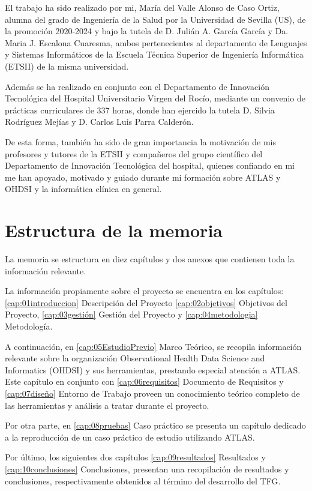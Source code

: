 El trabajo ha sido realizado por mi, María del Valle Alonso de Caso Ortiz, alumna del grado de Ingeniería de la Salud por la Universidad de Sevilla (US), de la promoción 2020-2024 y bajo la tutela de D. Julián A. García García y Da. Maria J. Escalona Cuaresma, ambos pertenecientes al departamento de Lenguajes y Sistemas Informáticos de la Escuela Técnica Superior de Ingeniería Informática (ETSII) de la misma universidad. 

Además se ha realizado en conjunto con el Departamento de Innovación Tecnológica del Hospital Universitario Virgen del Rocío, mediante un convenio de prácticas curriculares de 337 horas, donde han ejercido la tutela D. Silvia Rodríguez Mejías y D. Carlos Luis Parra Calderón. 

De esta forma, también ha sido de gran importancia la motivación de mis profesores y tutores de la ETSII y compañeros del grupo científico del Departamento de Innovación Tecnológica del hospital, quienes confiando en mi me han apoyado, motivado y guiado durante mi formación sobre ATLAS y OHDSI y la informática clínica en general.

\section{Estructura de la memoria} \label{sec:01estructura}

La memoria se estructura en diez capítulos y dos anexos que contienen toda la información relevante.

La información propiamente sobre el proyecto se encuentra en los capítulos: \ref{cap:01introduccion} Descripción del Proyecto \ref{cap:02objetivos} Objetivos del Proyecto, \ref{cap:03gestión} Gestión del Proyecto y \ref{cap:04metodologia} Metodología.

A continuación, en \ref{cap:05EstudioPrevio} Marco Teórico, se recopila información relevante sobre la organización Observational Health Data Science and Informatics (OHDSI) y sus herramientas, prestando especial atención a ATLAS. Este capítulo en conjunto con \ref{cap:06requisitos} Documento de Requisitos y \ref{cap:07diseño} Entorno de Trabajo proveen un conocimiento teórico completo de las herramientas y análisis a tratar durante el proyecto. 

Por otra parte, en \ref{cap:08pruebas} Caso práctico se presenta un capítulo dedicado a la reproducción de un caso práctico de estudio utilizando ATLAS. 

Por último, los siguientes dos capítulos \ref{cap:09resultados} Resultados y \ref{cap:10conclusiones} Conclusiones, presentan una recopilación de resultados y conclusiones, respectivamente obtenidos al término del desarrollo del TFG. 

